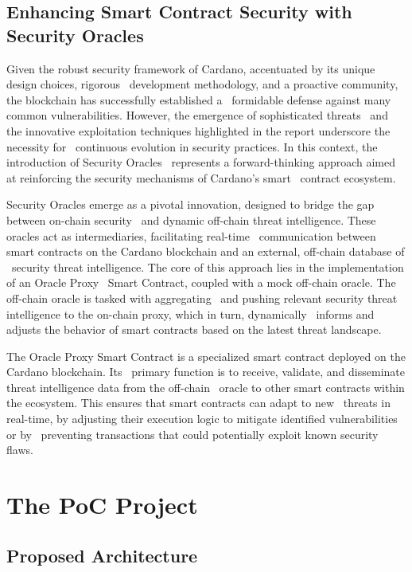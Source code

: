 \documentclass{scrreport}
\begin{document}
\section{Enhancing Smart Contract Security with Security Oracles}

Given the robust security framework of Cardano, accentuated by its unique design choices, rigorous \
development methodology, and a proactive community, the blockchain has successfully established a \
formidable defense against many common vulnerabilities. However, the emergence of sophisticated threats \
and the innovative exploitation techniques highlighted in the report underscore the necessity for \
continuous evolution in security practices. In this context, the introduction of Security Oracles \
represents a forward-thinking approach aimed at reinforcing the security mechanisms of Cardano's smart \
contract ecosystem.

Security Oracles emerge as a pivotal innovation, designed to bridge the gap between on-chain security \
and dynamic off-chain threat intelligence. These oracles act as intermediaries, facilitating real-time \
communication between smart contracts on the Cardano blockchain and an external, off-chain database of \
security threat intelligence. The core of this approach lies in the implementation of an Oracle Proxy \
Smart Contract, coupled with a mock off-chain oracle. The off-chain oracle is tasked with aggregating \
and pushing relevant security threat intelligence to the on-chain proxy, which in turn, dynamically \
informs and adjusts the behavior of smart contracts based on the latest threat landscape.

The Oracle Proxy Smart Contract is a specialized smart contract deployed on the Cardano blockchain. Its \
primary function is to receive, validate, and disseminate threat intelligence data from the off-chain \
oracle to other smart contracts within the ecosystem. This ensures that smart contracts can adapt to new \
threats in real-time, by adjusting their execution logic to mitigate identified vulnerabilities or by \
preventing transactions that could potentially exploit known security flaws.

\chapter{The PoC Project}
\label{chap:project}

\section{Proposed Architecture}
\end{document}
